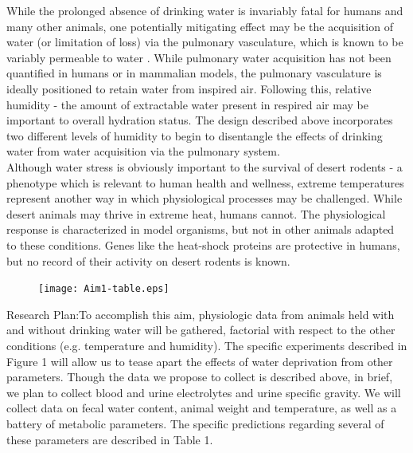 \documentclass[12pt]{article}
\begin{document}
While the prolonged absence of drinking water is invariably fatal for humans and many other animals, one potentially mitigating effect may be the acquisition of water (or limitation of loss) via the pulmonary vasculature, which is known to be variably permeable to water \citep{Berger:2011ks,Goralski:2010eo}. While pulmonary water acquisition has not been quantified in humans or in mammalian models, the pulmonary vasculature is ideally positioned to retain water from inspired air. Following this, relative humidity -  the amount of extractable water present in respired air may be important to overall hydration status. The design described above incorporates two different levels of humidity to begin to disentangle the effects of drinking water from water acquisition via the pulmonary system. \\
  

Although water stress is obviously important to the survival of desert rodents - a phenotype which is relevant to human health and wellness, extreme temperatures represent another way in which physiological processes may be challenged. While desert animals may thrive in extreme heat, humans cannot. The physiological response is characterized in model organisms, but not in other animals adapted to these conditions. Genes like the heat-shock proteins are protective in humans, but no record of their activity on desert rodents is known. \\

\begin{figure}
\hypertarget{Table 1}{}
\vspace{-5mm}
\begin{mdframed}
  \begin{center}
    \texttt{[image: Aim1-table.eps]}
  \end{center}
\end{mdframed}
\end{figure}


Research Plan:To accomplish this aim, physiologic data from animals held with and without drinking water will be gathered, factorial with respect to the other conditions (e.g. temperature and humidity). The specific experiments described in \hypertarget{Figure 1}{Figure 1} will allow us to tease apart the effects of water deprivation from other parameters. Though the data we propose to collect is described above, in brief, we plan to collect blood and urine electrolytes and urine specific gravity. We will collect data on fecal water content, animal weight and temperature, as well as a battery of metabolic parameters. The specific predictions regarding several of these parameters are described in Table 1.  \\
\end{document}

